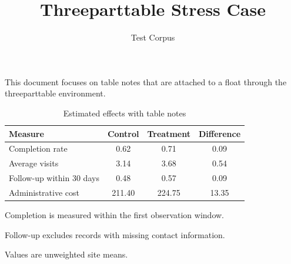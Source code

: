 \documentclass[11pt]{article}
\title{Threeparttable Stress Case}
\author{Test Corpus}
\date{}
\begin{document}
\maketitle

This document focuses on table notes that are attached to a float through the
threeparttable environment.

\begin{table}[htbp]
\centering
\caption{Estimated effects with table notes}
\label{tab:threepart}
\begin{threeparttable}
\begin{tabular}{lccc}
\toprule
Measure & Control & Treatment & Difference \\
\midrule
Completion rate\tnote{a} & 0.62 & 0.71 & 0.09 \\
Average visits & 3.14 & 3.68 & 0.54 \\
Follow-up within 30 days\tnote{b} & 0.48 & 0.57 & 0.09 \\
Administrative cost & 211.40 & 224.75 & 13.35 \\
\bottomrule
\end{tabular}
\begin{tablenotes}
\footnotesize
\item[a] Completion is measured within the first observation window.
\item[b] Follow-up excludes records with missing contact information.
\item[] Values are unweighted site means.
\end{tablenotes}
\end{threeparttable}
\end{table}
\end{document}
